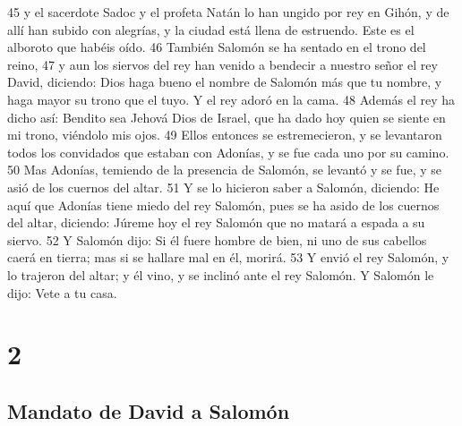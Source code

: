 45 y el sacerdote Sadoc y el profeta Natán lo han ungido por rey en Gihón, y de allí han subido con alegrías, y la ciudad está llena de estruendo. Este es el alboroto que habéis oído.
46 También Salomón se ha sentado en el trono del reino,
47 y aun los siervos del rey han venido a bendecir a nuestro señor el rey David, diciendo: Dios haga bueno el nombre de Salomón más que tu nombre, y haga mayor su trono que el tuyo. Y el rey adoró en la cama.
48 Además el rey ha dicho así: Bendito sea Jehová Dios de Israel, que ha dado hoy quien se siente en mi trono, viéndolo mis ojos.
49 Ellos entonces se estremecieron, y se levantaron todos los convidados que estaban con Adonías, y se fue cada uno por su camino.
50 Mas Adonías, temiendo de la presencia de Salomón, se levantó y se fue, y se asió de los cuernos del altar.
51 Y se lo hicieron saber a Salomón, diciendo: He aquí que Adonías tiene miedo del rey Salomón, pues se ha asido de los cuernos del altar, diciendo: Júreme hoy el rey Salomón que no matará a espada a su siervo.
52 Y Salomón dijo: Si él fuere hombre de bien, ni uno de sus cabellos caerá en tierra; mas si se hallare mal en él, morirá.
53 Y envió el rey Salomón, y lo trajeron del altar; y él vino, y se inclinó ante el rey Salomón. Y Salomón le dijo: Vete a tu casa.

\chapter{2}

\section*{Mandato de David a Salomón}

